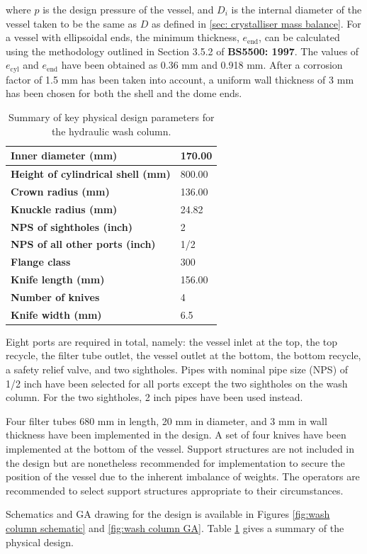 \noindent where $p$ is the design pressure of the vessel, and $D_i$ is the internal diameter of the vessel taken to be the same as $D$ as defined in \cref{sec: crystalliser mass balance}. For a vessel with ellipsoidal ends, the minimum thickness, $e_{\mathrm{end}}$, can be calculated using the methodology outlined in Section 3.5.2 of \textbf{BS5500: 1997}. The values of $e_{\mathrm{cyl}}$ and $e_{\mathrm{end}}$ have been obtained as 0.36 mm and 0.918 mm. After a corrosion factor of 1.5 mm has been taken into account, a uniform wall thickness of 3 mm has been chosen for both the shell and the dome ends. 

\begin{table}
\centering
\caption{Summary of key physical design parameters for the hydraulic wash column.}
\label{tab:wash column mech design summary}
\begin{tabular}{@{}l|l@{}}
\toprule
\textbf{Inner diameter (mm)}                &    170.00 \\ \midrule
\textbf{Height of cylindrical shell (mm)}   & 800.00 \\ \midrule
\textbf{Crown radius (mm)}                  & 136.00 \\ \midrule
\textbf{Knuckle radius (mm)}                & 24.82  \\ \midrule
\textbf{NPS of sightholes (inch)}                & 2 \\ \midrule
\textbf{NPS of all other ports (inch)}                & 1/2 \\ \midrule
\textbf{Flange class}                       & 300 \\ \midrule
\textbf{Knife length (mm)}              & 156.00 \\ \midrule
\textbf{Number of knives}            & 4 \\ \midrule
\textbf{Knife width (mm)}          & 6.5 \\ \bottomrule
\end{tabular}
\end{table}

Eight ports are required in total, namely: the vessel inlet at the top, the top recycle, the filter tube outlet, the vessel outlet at the bottom, the bottom recycle, a safety relief valve, and two sightholes. Pipes with nominal pipe size (NPS) of 1/2 inch have been selected for all ports except the two sightholes on the wash column. For the two sightholes, 2 inch pipes have been used instead. 


Four filter tubes 680 mm in length, 20 mm in diameter, and 3 mm in wall thickness have been implemented in the design. A set of four knives have been implemented at the bottom of the vessel. Support structures are not included in the design but are nonetheless recommended for implementation to secure the position of the vessel due to the inherent imbalance of weights. The operators are recommended to select support structures appropriate to their circumstances. 

Schematics and GA drawing for the design is available in Figures \ref{fig:wash column schematic} and \ref{fig:wash column GA}. Table \ref{tab:wash column mech design summary} gives a summary of the physical design. 








